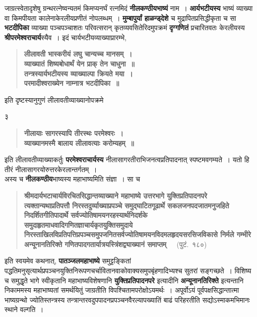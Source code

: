 \documentclass[11pt, openany]{book}
\begin{document}
जाग्रत्स्वेतादृशेषु ग्रन्थरत्नेष्वन्यतमं किमप्यनर्घं रत्नमिदं \textbf{नीलकण्ठीयभाष्यं} नाम~। \textbf{आर्यभटीयस्य} भाष्यं व्याख्या वा किमपीयता कालेनाकेरलीयप्रणीतं नोपलब्धम्~। \textbf{मुम्बापुर्यां हाळन्ड्देशे} च मुद्रापितप्रसिद्धीकृता च सा \textbf{भटदीपिका} व्याख्या पञ्चपञ्चाशतः परिवत्सरान् कृतव्यवसितेरिदमुपक्रमं \textbf{दृग्गणितं} प्रचारितवतः केरलीयस्य \textbf{श्रीपरमेश्वराचार्य}स्यैव~। इदं चार्यभटीयव्याख्याप्रारम्भे, 

\begin{quote}
\textbf{लीलावती भास्करीयं लघु चान्यच्च मानसम्~।\\
व्याख्यातं शिष्यबोधार्थं येन प्राक् तेन चाधुना~॥\\
तन्त्रस्यार्यभटीयस्य व्याख्याल्पा क्रियते मया~।\\
परमादीश्वराख्येन नाम्नात्र भटदीपिका~॥}
\end{quote}

\noindent इति दृष्टस्यानुगुणं लीलावतीव्याख्यानोपक्रमे\textendash 

\newpage

\begin{center} 
	३ 
\end{center}

\thispagestyle{empty} 
\begin{quote}
\textbf{नीलायाः सागरस्यापि तीरस्थः परमेश्वरः~।\\
व्याख्यानमस्मै बालाय लीलावत्याः करोम्यहम्~॥}
\end{quote}

\noindent इति लीलावतीव्याख्याकर्तुः \textbf{परमेश्वराचार्यस्य} नीलासागरतीराभिजनत्वप्रतिपादनात् स्पष्टमवगम्यते~। यतो हि तीरं नीलासागरयोरुत्तरकेरलान्तर्गतम्~।\\ 

अस्य च \textbf{नीलकण्ठीय}भाष्यस्य महाभाष्यमिति संज्ञा~। सा च
\begin{quote} 
\textbf{श्रीमदार्यभटाचार्यविरचितसिद्धान्तव्याख्याने महाभाष्ये उत्तरभागे युक्तिप्रतिपादनपरे त्यक्तान्यथाप्रतिपत्तौ निरस्तदुर्व्याख्याप्रपञ्चे
समुद्घाटितगूढार्थे सकलजनपदजातमनुजहिते निदर्शितगीतिपादार्थे सर्वज्योतिषामयनरहस्यार्थनिदर्शके समुदाहृतमाधवादिगणितज्ञाचार्यकृतयुक्तिसमुदाये निरस्ताखिलविप्रतिपत्तिप्रपञ्चसमुपजनितसर्वज्योतिषामयनविदमलहृदयसरसिजविकासे निर्मले गम्भीरे अन्यूनानतिरिक्ते गणितपादगतार्यात्रयस्त्रिंशद्व्याख्यानं समाप्तम्}~~~(पुटं.~१८०)
\end{quote} 
\noindent इति स्वयमेव कथनात्, \textbf{पातञ्जलमहाभाष्ये} समुट्टङ्कितां पद्धतिमनुसृत्यार्थप्रपञ्चनयुक्तिनिरूपणचर्चावितानवाकोवाक्यसमुपबृंहणादिभ्यश्च
सुतरां सङ्गच्छते~। विशिष्य च समुद्धृते भागे स्वीकृतानि महाभाष्यविशेषणानि \textbf{युक्तिप्रतिपादनपरे} इत्यादीनि \textbf{अन्यूनानतिरिक्ते} इत्यन्तानि निकाममस्य महाभाष्यतां समर्थयितुं जाग्रतीति विपश्चितामपरोक्षोऽयमर्थः~। अपूर्वोऽयं
पूर्वपक्षसिद्धान्तात्मा भाष्यग्रन्थो ज्योतिस्तन्त्रस्य तन्त्रान्तरवदुपपादनप्रपञ्चनवैरल्यापख्यातिं बाढं परिहरतीति सद्योऽस्माकमभिमानः स्थाने वल्गति~। \\
\end{document}
